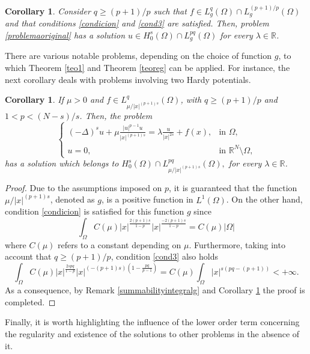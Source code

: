 \documentclass[preprint,12pt]{elsarticle}
\newtheorem{corollary}[theorem]{Corollary}
\begin{document}
		
		\begin{corollary}\label{finalregularity}
			Consider $q\geq (p+1)/p$ such that $f\in L^q_g(\Omega)\cap L^{(p+1)/p}_g(\Omega)$ and that conditions \eqref{condicion} and \eqref{cond3} are satisfied. 
			Then, problem \eqref{problemaoriginal} has a solution $u\in H^s_0(\Omega)\cap L^{p q}_g(\Omega) $ for every $\lambda \in \mathbb{R}$.
		\end{corollary}
		There are various notable problems, depending on the choice of function $g$, to which Theorem \ref{teo1} and Theorem \ref{teoreg} can be applied. For instance, the next corollary deals with problems involving two Hardy potentials. 
		\begin{corollary}\label{twohardy}
			If $\mu>0$ and $f\in L^{q}_{\mu/|x|^{(p+1)s}}(\Omega)$, with $q\geq (p+1)/p$ and $1<p<(N-s)/s$. Then, the problem 
			\begin{equation}\label{problemtwohardy}
				\begin{cases}
					\displaystyle(-\Delta)^s u+ \mu\frac{|u|^{p-1}u}{|x|^{(p+1)s}}= \lambda \frac{u}{|x|^{2s}}+f(x), &  \text{in $\Omega$,}\\
					u=0, & \text{in $\mathbb{R}^N\setminus\Omega$,}
				\end{cases}
			\end{equation}
			has a solution which belongs to $ H^s_0(\Omega)\cap L^{pq}_{\mu/|x|^{(p+1)s}}(\Omega),$ for every $\lambda\in \mathbb{R}$.
		\end{corollary}
		\begin{proof}
			Due to the assumptions imposed on $p$, it is guaranteed that the function $\mu/|x|^{(p+1)s}$, denoted as $g$, is a positive function in $L^1(\Omega)$. On the other hand, condition \eqref{condicion} is satisfied for this function $g$ since
			\[
			\int_{\Omega} C(\mu)|x|^{\frac{2(p+1)s}{1-p}}|x|^{\frac{-2(p+1)s}{1-p}}=C(\mu)|\Omega|
			\]
			where $C(\mu)$ refers to a constant depending on $\mu$. Furthermore, taking into account that $q\geq (p+1)/p$, condition \eqref{cond3} also holds
			\[
			\int_{\Omega} C(\mu)|x|^{\frac{2spq}{1-p}}|x|^{(-(p+1)s)(1-\frac{pq}{p-1})} =C(\mu)\int_{\Omega} |x|^{s(pq-(p+1))}<+\infty.
			\]
			As a consequence, by Remark \ref{summabilityintegralg} and Corollary \ref{finalregularity} the proof is completed.
		\end{proof}
		
		
		Finally, it is worth highlighting the influence of the lower order term concerning the regularity and existence of the solutions to other problems in the absence of it.
		
\end{document}

